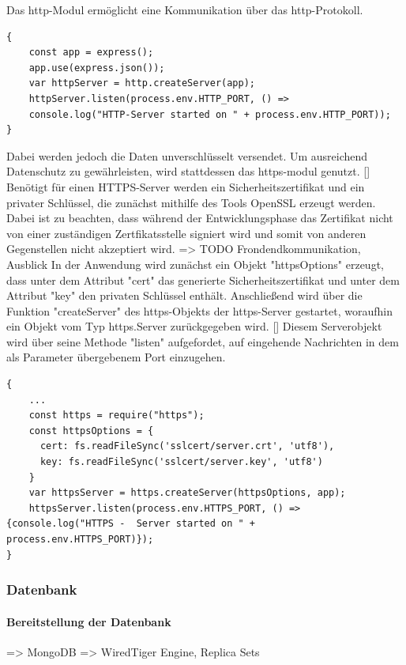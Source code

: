 Das http-Modul ermöglicht eine Kommunikation über das http-Protokoll. 
\begin{lstlisting}[caption=Einfache Verbindung, label=lst:nodejs_easyconnection]
 {
 	const app = express();
	app.use(express.json()); 
 	var httpServer = http.createServer(app);
 	httpServer.listen(process.env.HTTP_PORT, () => 
 	console.log("HTTP-Server started on " + process.env.HTTP_PORT));
}
\end{lstlisting}

Dabei werden jedoch die Daten unverschlüsselt versendet. Um ausreichend Datenschutz zu gewährleisten, wird stattdessen das https-modul genutzt. []%
\newline
Benötigt für einen HTTPS-Server werden ein Sicherheitszertifikat und ein privater Schlüssel, die zunächst mithilfe des Tools OpenSSL erzeugt werden.  
Dabei ist zu beachten, dass während der Entwicklungsphase das Zertifikat nicht von einer zuständigen Zertfikatsstelle signiert wird und somit von anderen Gegenstellen nicht akzeptiert wird. => TODO Frondendkommunikation, Ausblick
\newline
In der Anwendung wird zunächst ein Objekt "httpsOptions" erzeugt, dass unter dem Attribut "cert" das generierte Sicherheitszertifikat und unter dem Attribut "key" den privaten Schlüssel enthält. Anschließend wird über die Funktion "createServer" des https-Objekts der https-Server gestartet, woraufhin ein Objekt vom Typ https.Server zurückgegeben wird. []
Diesem Serverobjekt wird über seine Methode "listen" aufgefordet, auf eingehende Nachrichten in dem als Parameter übergebenem Port einzugehen.

\begin{lstlisting}[caption=Gesicherte Verbindung, label=lst:nodejs_safeconnection]
 {
 	...
	const https = require("https");
	const httpsOptions = {
	  cert: fs.readFileSync('sslcert/server.crt', 'utf8'),
	  key: fs.readFileSync('sslcert/server.key', 'utf8')
	}
	var httpsServer = https.createServer(httpsOptions, app);
	httpsServer.listen(process.env.HTTPS_PORT, () => {console.log("HTTPS - 	Server started on " + process.env.HTTPS_PORT)});
}
\end{lstlisting}

\subsubsection{Datenbank}
\paragraph{Bereitstellung der Datenbank}
=> MongoDB 
=> WiredTiger Engine, Replica Sets

